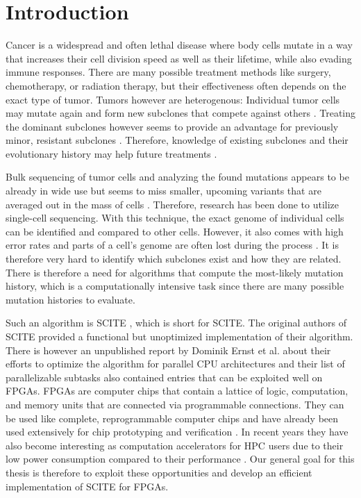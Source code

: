 \chapter{Introduction}
\label{ch:introduction}

Cancer is a widespread and often lethal disease \cite{10.1001/jamaoncol.2021.6987} where body cells mutate in a way that increases their cell division speed as well as their lifetime, while also evading immune responses. There are many possible treatment methods like surgery, chemotherapy, or radiation therapy, but their effectiveness often depends on the exact type of tumor. Tumors however are heterogenous: Individual tumor cells may mutate again and form new subclones that compete against others \cite{nik2012life}. Treating the dominant subclones however seems to provide an advantage for previously minor, resistant subclones \cite{gillies2012evolutionary}. Therefore, knowledge of existing subclones and their evolutionary history may help future treatments \cite{greaves2012clonal, stratton2009cancer, swanton2012intratumor}.

Bulk sequencing of tumor cells and analyzing the found mutations appears to be already in wide use but seems to miss smaller, upcoming variants that are averaged out in the mass of cells \cite{navin2014cancer}. Therefore, research has been done to utilize single-cell sequencing. With this technique, the exact genome of individual cells can be identified and compared to other cells. However, it also comes with high error rates and parts of a cell's genome are often lost during the process \cite{tree2016}. It is therefore very hard to identify which subclones exist and how they are related. There is therefore a need for algorithms that compute the most-likely mutation history, which is a computationally intensive task since there are many possible mutation histories to evaluate.

Such an algorithm is \acs{SCITE} \cite{tree2016}, which is short for \acl{SCITE}. The original authors of \ac{SCITE} provided a functional but unoptimized implementation of their algorithm. There is however an unpublished report by Dominik Ernst et al. \cite{ernst2020Performance} about their efforts to optimize the algorithm for parallel CPU architectures and their list of parallelizable subtasks also contained entries that can be exploited well on \acsp{FPGA}. \acp{FPGA} are computer chips that contain a lattice of logic, computation, and memory units that are connected via programmable connections. They can be used like complete, reprogrammable computer chips and have already been used extensively for chip prototyping and verification \cite{rodriguez2007features}. In recent years they have also become interesting as computation accelerators for \ac{HPC} users due to their low power consumption compared to their performance \cite{betkaoui2010comparing}. Our general goal for this thesis is therefore to exploit these opportunities and develop an efficient implementation of \ac{SCITE} for \acp{FPGA}. 


